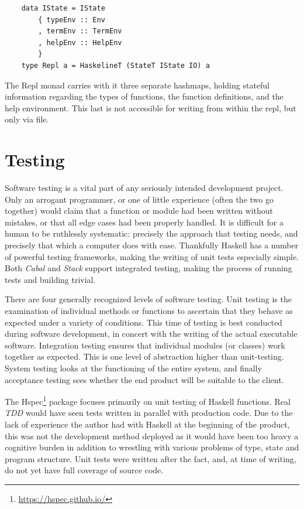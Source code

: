 \documentclass[12pt, a4paper]{report}
\begin{document}
\begin{verbatim}
    data IState = IState
        { typeEnv :: Env
        , termEnv :: TermEnv
        , helpEnv :: HelpEnv
        }
    type Repl a = HaskelineT (StateT IState IO) a
\end{verbatim}

The Repl monad carries with it three separate hashmaps, holding stateful information regarding the
types of functions, the function definitions, and the help environment. This last is not accessible
for writing from within the repl, but only via file.

\chapter{Testing}

Software testing is a vital part of any seriously intended development project. Only an arrogant
programmer, or one of little experience (often the two go together) would claim that a function or
module had been written without mistakes, or that all edge cases had been properly handled. It is
difficult for a human to be ruthlessly systematic: precisely the approach that testing needs, and
precisely that which a computer does with ease. Thankfully Haskell has a number of powerful testing
frameworks, making the writing of unit tests especially simple. Both \textit{Cabal} and
\textit{Stack} support integrated testing, making the process of running tests and building trivial.

There are four generally recognized levels of software testing. Unit testing is the examination of
individual methods or functions to ascertain that they behave as expected under a variety of
conditions. This time of testing is best conducted during software development, in concert with the
writing of the actual executable software. Integration testing ensures that individual modules (or
classes) work together as expected. This is one level of abstraction higher than unit-testing.
System testing looks at the functioning of the entire system, and finally acceptance testing sees
whether the end product will be suitable to the client. 

The Hspec\footnote{\url{https://hspec.github.io/}} package focuses primarily on unit testing of
Haskell functions. Real \textit{TDD} would have seen tests written in parallel with production code.
Due to the lack of experience the author had with Haskell at the beginning of the product, this was
not the development method deployed as it would have been too heavy a cognitive burden in addition
to wrestling with various problems of type, state and program structure. Unit tests were written
after the fact, and, at time of writing, do not yet have full coverage of source code.
\end{document}
